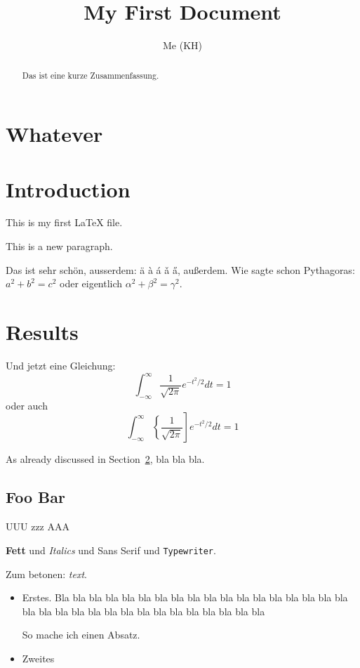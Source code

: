 \documentclass{article}
\title{My First Document}
\author{Me (KH)}
\begin{document}
\maketitle

\begin{abstract}
  Das ist eine kurze Zusammenfassung.
\end{abstract}

\tableofcontents

\section{Whatever}

\section{Introduction}
\label{sec:intro}

This is      my    first \LaTeX{} file.

This is a new paragraph.

Das ist sehr sch\"on, ausserdem: \"a \`a \'a \v{a} \H{a}, au\ss{}erdem.
Wie sagte schon Pythagoras: $a^2 + b^2 = c^2$ oder eigentlich
\begin{math}\alpha^2 + \beta^2 = \gamma^2\end{math}.

\section{Results}

Und jetzt eine Gleichung:
$$ \int_{-\infty}^{\infty} \frac{1}{\sqrt{2\pi}} e^{-t^2/2} dt = 1 $$
oder auch
\begin{displaymath}
  \int_{-\infty}^{\infty} \left\{ \frac{1}{\sqrt{2\pi}} \right] e^{-t^2/2} dt = 1
\end{displaymath}

As already discussed in Section~\ref{sec:intro}, bla bla bla.

\subsection{Foo Bar}

{\Large UUU} {\tiny zzz} {\Huge AAA}

\textbf{Fett} und \textit{Italics} und \textsf{Sans Serif} und
\texttt{Typewriter}.

Zum betonen: \emph{text}.

\begin{itemize}
 \item Erstes.    Bla bla bla bla bla bla
  bla bla bla bla bla bla bla bla bla bla bla bla bla bla bla bla bla
  bla bla bla bla bla bla bla bla bla bla

  So mache ich einen Absatz.
 \item Zweites
\end{itemize}
\end{document}
